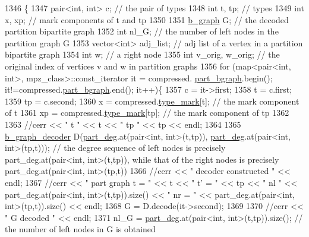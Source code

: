 \begin{DoxyCode}
1346 \{
1347   pair<int, int> c; \textcolor{comment}{// the pair of types}
1348   \textcolor{keywordtype}{int} t, tp; \textcolor{comment}{// types}
1349   \textcolor{keywordtype}{int} x, xp; \textcolor{comment}{// mark components of t and tp}
1350 
1351   \hyperlink{classb__graph}{b\_graph} G; \textcolor{comment}{// the decoded partition bipartite graph}
1352   \textcolor{keywordtype}{int} nl\_G; \textcolor{comment}{// the number of left nodes in the partition graph G }
1353   vector<int> adj\_list; \textcolor{comment}{// adj list of a vertex in a partition bipartite graph}
1354   \textcolor{keywordtype}{int} w; \textcolor{comment}{// a right node}
1355   \textcolor{keywordtype}{int} v\_orig, w\_orig; \textcolor{comment}{// the original index of vertices v and w in partition graphs }
1356   \textcolor{keywordflow}{for} (map<pair<int, int>, mpz\_class>::const\_iterator it = compressed.
      \hyperlink{classmarked__graph__compressed_a7b3267063fba30b45eb21b3ba4e07536}{part\_bgraph}.begin(); it!=compressed.\hyperlink{classmarked__graph__compressed_a7b3267063fba30b45eb21b3ba4e07536}{part\_bgraph}.end(); it++)\{
1357     c = it->first;
1358     t = c.first;
1359     tp = c.second;
1360     x = compressed.\hyperlink{classmarked__graph__compressed_a86b00223525703e973415cbc9c94da68}{type\_mark}[t]; \textcolor{comment}{// the mark component of t}
1361     xp = compressed.\hyperlink{classmarked__graph__compressed_a86b00223525703e973415cbc9c94da68}{type\_mark}[tp]; \textcolor{comment}{// the mark component of tp }
1362 
1363     \textcolor{comment}{//cerr << " t " << t << " tp " << tp << endl;}
1364 
1365     \hyperlink{classb__graph__decoder}{b\_graph\_decoder} D(\hyperlink{classmarked__graph__decoder_a6882e96fcad9abb10e72f1398814824a}{part\_deg}.at(pair<int, int>(t,tp)), 
      \hyperlink{classmarked__graph__decoder_a6882e96fcad9abb10e72f1398814824a}{part\_deg}.at(pair<int, int>(tp,t))); \textcolor{comment}{// the degree sequence of left nodes is precisely
       part\_deg.at(pair<int, int>(t,tp)), while that of the right nodes is precisely part\_deg.at(pair<int, int>(tp,t))}
1366     \textcolor{comment}{//cerr << " decoder constructed " << endl;}
1367     \textcolor{comment}{//cerr << " part graph t = "  << t << " t' = " << tp << " nl " << part\_deg.at(pair<int,
       int>(t,tp)).size() << " nr = " << part\_deg.at(pair<int, int>(tp,t)).size() << endl;}
1368     G = D.decode(it->second);
1369 
1370     \textcolor{comment}{//cerr << " G decoded " << endl;}
1371     nl\_G = \hyperlink{classmarked__graph__decoder_a6882e96fcad9abb10e72f1398814824a}{part\_deg}.at(pair<int, int>(t,tp)).size(); \textcolor{comment}{// the number of left nodes in G is obtained
}
\end{DoxyCode}
